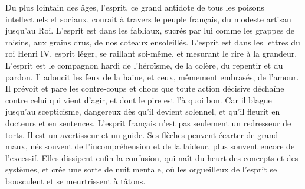 \documentclass[french,twoside]{book} %
\begin{document}
Du plus lointain des âges, l’esprit, ce grand antidote de tous les poisons intellectuels et sociaux, courait à travers le peuple français, du modeste artisan jusqu’au Roi. L’esprit est dans les fabliaux, sucrés par lui comme les grappes de raisins, aux grains drus, de nos coteaux ensoleillés. L’esprit est dans les lettres du roi Henri IV, esprit léger, se raillant soi-même, et mesurant le rire à la grandeur. L’esprit est le compagnon hardi de l’héroïsme, de la colère, du repentir et du pardon. Il adoucit les feux de la haine, et ceux, mêmement embrasés, de l’amour. Il prévoit et pare les contre-coups et chocs que toute action décisive déchaîne contre celui qui vient d’agir, et dont le pire est l’à quoi bon. Car il blague jusqu’au scepticisme, dangereux dès qu’il devient solennel, et qu’il fleurit en docteurs et en sentences. L’esprit français n’est pas seulement un redresseur de torts. Il est un avertisseur et un guide. Ses flèches peuvent écarter de grand maux, nés souvent de l’incompréhension et de la laideur, plus souvent encore de l’excessif. Elles dissipent enfin la confusion, qui naît du heurt des concepts et des systèmes, et crée une sorte de nuit mentale, où les orgueilleux de l’esprit se bousculent et se meurtrissent à tâtons.\par
\end{document}

